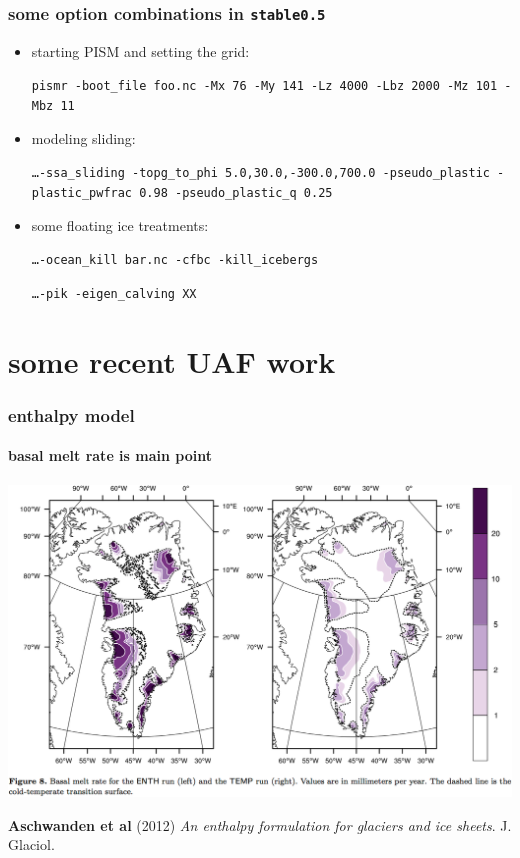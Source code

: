 \documentclass[hide notes,intlimits]{beamer}
\begin{document}
\begin{frame}
  \frametitle{some option combinations in \texttt{stable0.5}}
  \begin{itemize}
  \item starting PISM and setting the grid:
    \begin{center}
    \vspace{-2mm}\small
      \texttt{pismr -boot\_file foo.nc -Mx 76 -My 141 -Lz 4000 -Lbz 2000 -Mz 101 -Mbz 11}
    \end{center}
  \item modeling sliding:
    \begin{center}
    \vspace{-2mm}\small
      \texttt{\dots -ssa\_sliding -topg\_to\_phi 5.0,30.0,-300.0,700.0 -pseudo\_plastic -plastic\_pwfrac 0.98 -pseudo\_plastic\_q 0.25}
    \end{center}
  \item some floating ice treatments:
    \begin{center}
    \vspace{-2mm}\small
      \texttt{\dots -ocean\_kill bar.nc -cfbc -kill\_icebergs}

      \texttt{\dots -pik -eigen\_calving XX}
    \end{center}
  \end{itemize}
\end{frame}


\section[UAF work]{some recent UAF work}

\begin{frame}
  \frametitle{enthalpy model}
  \framesubtitle{basal melt rate is main point}

  \begin{center}
    \includegraphics[height=0.7\textheight]{enthalpy-model.png}
  \end{center}

  \begin{flushleft}
  \tiny \textbf{Aschwanden et al} (2012) \emph{An enthalpy
      formulation for glaciers and ice sheets}. J. Glaciol.
 \end{flushleft}
\end{frame}
\end{document}
